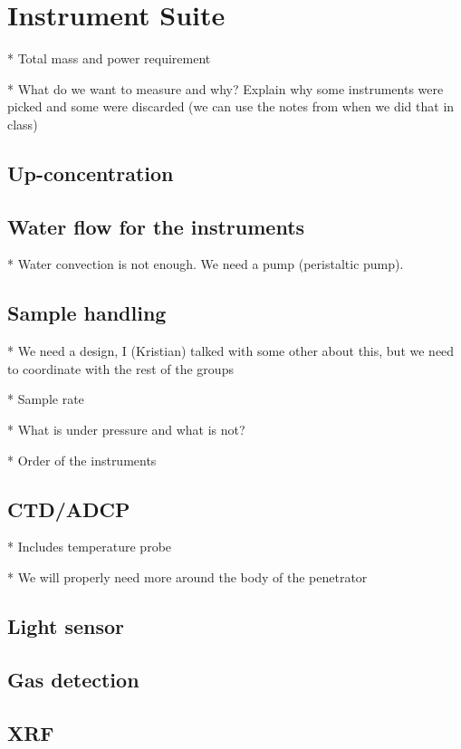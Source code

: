 \documentclass{book}
\begin{document}
\section{Instrument Suite}

* Total mass and power requirement

* What do we want to measure and why? Explain why some instruments were picked and some were discarded (we can use the notes from when we did that in class)

\subsection{Up-concentration}

\subsection{Water flow for the instruments} %

* Water convection is not enough. We need a pump (peristaltic pump).

\subsection{Sample handling}

* We need a design, I (Kristian) talked with some other about this, but we need to coordinate with the rest of the groups

* Sample rate

* What is under pressure and what is not?

* Order of the instruments


\subsection{CTD/ADCP} %

* Includes temperature probe

    * We will properly need more around the body of the penetrator

\subsection{Light sensor}

\subsection{Gas detection}

\subsection{XRF}
\end{document}

